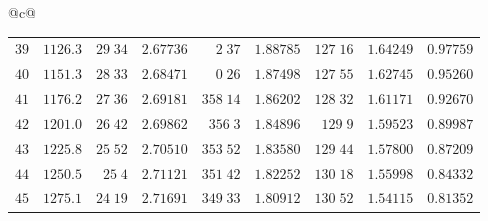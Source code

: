\begin{center}
{\begin{tabular}{@{}c@{}}
\begin{tabular}{r|r|r|r|r|r|r|r|r}
$39$&$1126.3$&$29\;34$&$2.67736$&$2\;37$&$1.88785$&$127\;16$&$1.64249$&$0.97759$\\[2pt]
$40$&$1151.3$&$28\;33$&$2.68471$&$0\;26$&$1.87498$&$127\;55$&$1.62745$&$0.95260$\\
$41$&$1176.2$&$27\;36$&$2.69181$&$358\;14$&$1.86202$&$128\;32$&$1.61171$&$0.92670$\\
$42$&$1201.0$&$26\;42$&$2.69862$&$356\;3$&$1.84896$&$129\;9$&$1.59523$&$0.89987$\\
$43$&$1225.8$&$25\;52$&$2.70510$&$353\;52$&$1.83580$&$129\;44$&$1.57800$&$0.87209$\\
$44$&$1250.5$&$25\;4$&$2.71121$&$351\;42$&$1.82252$&$130\;18$&$1.55998$&$0.84332$\\[2pt]
$45$&$1275.1$&$24\;19$&$2.71691$&$349\;33$&$1.80912$&$130\;52$&$1.54115$&$0.81352$\\
\end{tabular}
\end{tabular}%
}
\end{center}
\endgroup
\clearpage
{}
\begingroup
\fontsize{9}{10.2}\selectfont
\setlength{\tabcolsep}{1.5pt}
\renewcommand{\arraystretch}{1.02}
